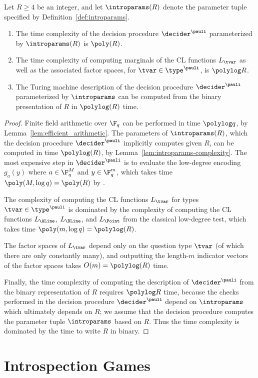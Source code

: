 \begin{lemma}
  \label{lem:qld-complexity}
  Let $R \geq 4$ be an integer, and let $\introparams(R)$ denote the parameter tuple
  specified by Definition~\ref{def:introparams}.
  \begin{enumerate}
	\item The time complexity of the decision procedure $\decider^\pauli$
    parameterized by $\introparams(R)$ is $\poly(R)$.
	\item The time complexity of computing marginals of the CL functions $L_\tvar$
    as well as the associated factor spaces, for $\tvar \in \type^\pauli$, is
    $\polylog R$.
	\item The Turing machine description of the decision procedure
    $\decider^\pauli$ parameterized by $\introparams$ can be computed from the
    binary presentation of $R$ in $\polylog (R)$ time.
  \end{enumerate}
\end{lemma}

\begin{proof}
	Finite field arithmetic over $\F_q$ can be performed in time $\polylog q$, by
  Lemma~\ref{lem:efficient_arithmetic}.
  The parameters of $\introparams(R)$, which the decision procedure
  $\decider^\pauli$ implicitly computes given $R$, can be computed in time
  $\polylog(R)$, by Lemma~\ref{lem:introparams-complexity}.
  The most expensive step in $\decider^\pauli$ is to evaluate the low-degree
  encoding $g_{a}(y)$ where $a \in \F_q^M$ and $y \in \F_q^m$, which
  takes time $\poly(M,\log q) = \poly(R)$ by .
	
  The complexity of computing the CL functions $L_\tvar$ for types $\tvar \in
  \type^\pauli$ is dominated by the complexity of computing the CL functions
  $L_\ALine$, $L_\DLine$, and $L_\Point$ from the classical low-degree test, which takes time
  $\poly(m, \log q) = \polylog(R)$.

  The factor spaces of $L_\tvar$ depend only on the question type $\tvar$ (of
  which there are only constantly many), and outputting the length-$m$ indicator
  vectors of the factor spaces takes $O(m) = \polylog (R)$ time.

  Finally, the time complexity of computing the description of $\decider^\pauli$
  from the binary representation of $R$ requires $\polylog R$ time, because the
  checks performed in the decision procedure $\decider^\pauli$ depend on
  $\introparams$ which ultimately depends on $R$; we assume that the decision
  procedure computes the parameter tuple $\introparams$ based on $R$.
  Thus the time complexity is dominated by the time to write $R$ in binary.
\end{proof}
 
\section{Introspection Games}
